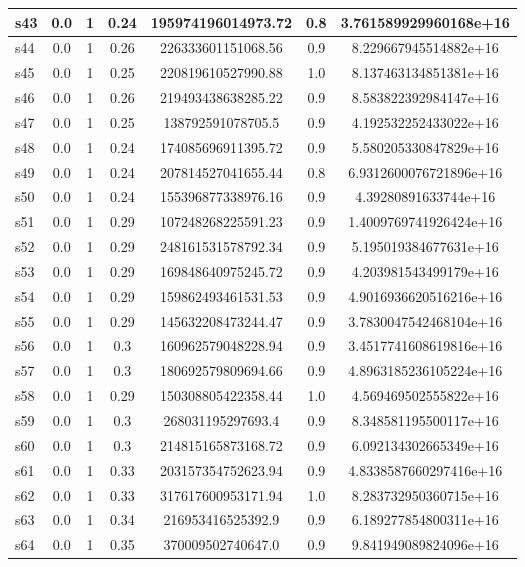 \documentclass{article}
\begin{document}
\begin{tabular}{|l|c|c|c|c|c|c|}
\hline
s43 &0.0 & 1 & 0.24 & 195974196014973.72 & 0.8 & 3.761589929960168e+16\\
\hline
s44 &0.0 & 1 & 0.26 & 226333601151068.56 & 0.9 & 8.229667945514882e+16\\
\hline
s45 &0.0 & 1 & 0.25 & 220819610527990.88 & 1.0 & 8.137463134851381e+16\\
\hline
s46 &0.0 & 1 & 0.26 & 219493438638285.22 & 0.9 & 8.583822392984147e+16\\
\hline
s47 &0.0 & 1 & 0.25 & 138792591078705.5 & 0.9 & 4.192532252433022e+16\\
\hline
s48 &0.0 & 1 & 0.24 & 174085696911395.72 & 0.9 & 5.580205330847829e+16\\
\hline
s49 &0.0 & 1 & 0.24 & 207814527041655.44 & 0.8 & 6.9312600076721896e+16\\
\hline
s50 &0.0 & 1 & 0.24 & 155396877338976.16 & 0.9 & 4.39280891633744e+16\\
\hline
s51 &0.0 & 1 & 0.29 & 107248268225591.23 & 0.9 & 1.4009769741926424e+16\\
\hline
s52 &0.0 & 1 & 0.29 & 248161531578792.34 & 0.9 & 5.195019384677631e+16\\
\hline
s53 &0.0 & 1 & 0.29 & 169848640975245.72 & 0.9 & 4.203981543499179e+16\\
\hline
s54 &0.0 & 1 & 0.29 & 159862493461531.53 & 0.9 & 4.9016936620516216e+16\\
\hline
s55 &0.0 & 1 & 0.29 & 145632208473244.47 & 0.9 & 3.7830047542468104e+16\\
\hline
s56 &0.0 & 1 & 0.3 & 160962579048228.94 & 0.9 & 3.4517741608619816e+16\\
\hline
s57 &0.0 & 1 & 0.3 & 180692579809694.66 & 0.9 & 4.8963185236105224e+16\\
\hline
s58 &0.0 & 1 & 0.29 & 150308805422358.44 & 1.0 & 4.569469502555822e+16\\
\hline
s59 &0.0 & 1 & 0.3 & 268031195297693.4 & 0.9 & 8.348581195500117e+16\\
\hline
s60 &0.0 & 1 & 0.3 & 214815165873168.72 & 0.9 & 6.092134302665349e+16\\
\hline
s61 &0.0 & 1 & 0.33 & 203157354752623.94 & 0.9 & 4.8338587660297416e+16\\
\hline
s62 &0.0 & 1 & 0.33 & 317617600953171.94 & 1.0 & 8.283732950360715e+16\\
\hline
s63 &0.0 & 1 & 0.34 & 216953416525392.9 & 0.9 & 6.189277854800311e+16\\
\hline
s64 &0.0 & 1 & 0.35 & 370009502740647.0 & 0.9 & 9.841949089824096e+16\\

\end{tabular}
\end{document}
